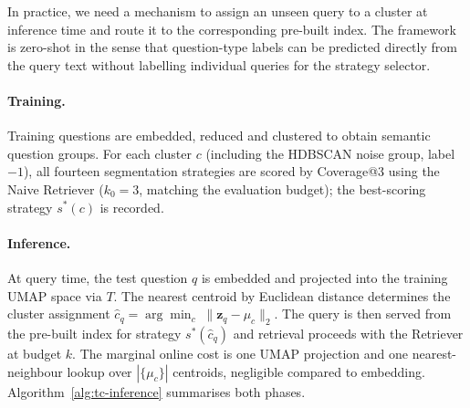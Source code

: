 In practice, we need a mechanism to assign an unseen query
to a cluster at inference time and route it to the corresponding pre-built index. The framework is zero-shot in the sense that question-type labels can be predicted
directly from the query text without labelling
individual queries for the strategy selector.


\paragraph{Training.}
Training questions are embedded, reduced and clustered to obtain semantic question groups.
For each cluster $c$ (including the HDBSCAN noise group, label $-1$), all
fourteen segmentation strategies are scored by Coverage@3 using the Naive
Retriever ($k_0{=}3$, matching the evaluation budget); the best-scoring
strategy $s^{*}(c)$ is recorded.


\paragraph{Inference.}
At query time, the test question $q$ is embedded and projected into the training
UMAP space via $T$.
The nearest centroid by Euclidean distance determines the cluster assignment
$\hat{c}_q = \arg\min_{c}\;\|\mathbf{z}_q - \mu_c\|_2$.
The query is then served from the pre-built index for strategy $s^{*}(\hat{c}_q)$
and retrieval proceeds with the Retriever at budget $k$.
The marginal online cost is one UMAP projection and one nearest-neighbour
lookup over $|\{\mu_c\}|$ centroids, negligible compared to embedding.
Algorithm~\ref{alg:tc-inference} summarises both phases.



